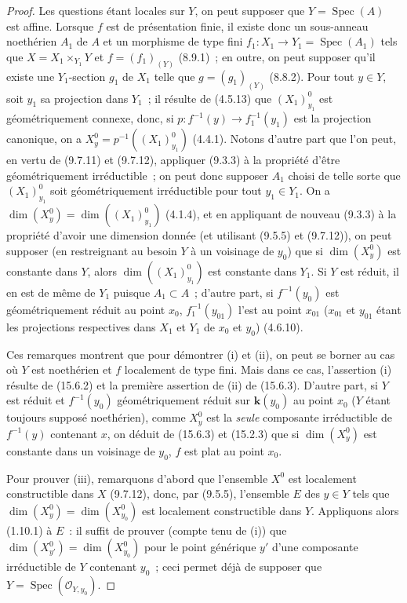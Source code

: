 \begin{proof}
Les questions étant locales sur $Y$, on peut supposer que $Y=\operatorname{Spec}(A)$ est affine. Lorsque $f$ est de présentation finie, il existe donc un sous-anneau noethérien $A_1$ de $A$ et un morphisme de type fini $f_1:X_1\to Y_1=\operatorname{Spec}(A_1)$ tels que $X=X_1\times_{Y_1}Y$ et $f=(f_1)_{(Y)}$ (8.9.1)~; en outre, on peut supposer qu'il existe une $Y_1$-section $g_1$ de $X_1$ telle que $g=(g_1)_{(Y)}$ (8.8.2). Pour tout $y\in Y$, soit $y_1$ sa projection dans $Y_1$~; il résulte de (4.5.13) que $(X_1)_{y_1}^0$ est géométriquement connexe, donc, si $p:f^{-1}(y)\to f_1^{-1}(y_1)$ est la projection canonique, on a $X_y^0=p^{-1}((X_1)_{y_1}^0)$ (4.4.1). Notons d'autre part que l'on peut, en vertu de (9.7.11) et (9.7.12), appliquer (9.3.3) à la propriété d'être géométriquement irréductible~; on peut donc supposer $A_1$ choisi de telle sorte que $(X_1)_{y_1}^0$ soit géométriquement irréductible pour tout $y_1\in Y_1$. On a $\dim(X_y^0)=\dim((X_1)_{y_1}^0)$ (4.1.4), et en appliquant de nouveau (9.3.3) à la propriété d'avoir une dimension donnée (et utilisant (9.5.5) et (9.7.12)), on peut supposer (en restreignant au besoin $Y$ à un voisinage de $y_0$) que si $\dim(X_y^0)$ est constante dans $Y$, alors $\dim((X_1)_{y_1}^0)$ est constante dans $Y_1$. Si $Y$ est réduit, il en est de même de $Y_1$ puisque $A_1\subset A$~; d'autre part, si $f^{-1}(y_0)$ est géométriquement réduit au point $x_0$, $f_1^{-1}(y_{01})$ l'est au point $x_{01}$ ($x_{01}$ et $y_{01}$ étant les projections respectives dans $X_1$ et $Y_1$ de $x_0$ et $y_0$) (4.6.10).

Ces remarques montrent que pour démontrer (i) et (ii), on peut se borner au cas où $Y$ est noethérien et $f$ localement de type fini. Mais dans ce cas, l'assertion (i) résulte de (15.6.2) et la première assertion de (ii) de (15.6.3). D'autre part, si $Y$ est réduit et $f^{-1}(y_0)$ géométriquement réduit sur $\boldsymbol{k}(y_0)$ au point $x_0$ ($Y$ étant toujours supposé
noethérien), comme $X_y^0$ est la \emph{seule} composante irréductible de $f^{-1}(y)$ contenant $x$, on déduit de (15.6.3) et (15.2.3) que si $\dim(X_y^0)$ est constante dans un voisinage de $y_0$, $f$ est plat au point $x_0$.

Pour prouver (iii), remarquons d'abord que l'ensemble $X^0$ est localement constructible dans $X$ (9.7.12), donc, par (9.5.5), l'ensemble $E$ des $y\in Y$ tels que $\dim(X_y^0)=\dim(X_{y_0}^0)$ est localement constructible dans $Y$. Appliquons alors (1.10.1) à $E$~: il suffit de prouver (compte tenu de (i)) que $\dim(X_{y'}^0)=\dim(X_{y_0}^0)$ pour le point générique $y'$ d'une composante irréductible de $Y$ contenant $y_0$~; ceci permet déjà de supposer que $Y=\operatorname{Spec}(\mathcal O_{Y,y_0})$.


\end{proof}
